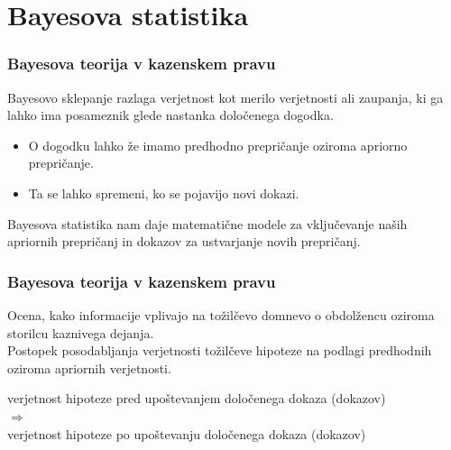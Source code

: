 \documentclass{beamer}
\begin{document}
\section{Bayesova statistika}

\begin{frame}
    \frametitle{Bayesova teorija v kazenskem pravu}
    Bayesovo sklepanje razlaga verjetnost kot merilo verjetnosti ali zaupanja, ki ga lahko ima posameznik glede nastanka določenega dogodka.
    \begin{itemize}
      \item O dogodku lahko že imamo predhodno prepričanje oziroma apriorno prepričanje.
      \item Ta se lahko spremeni, ko se pojavijo novi dokazi.
    \end{itemize} \vspace{3mm}
    Bayesova statistika nam daje matematične modele za vključevanje naših apriornih prepričanj in dokazov za ustvarjanje novih prepričanj.
\end{frame}

\begin{frame}
    \frametitle{Bayesova teorija v kazenskem pravu}
    Ocena, kako informacije vplivajo na tožilčevo domnevo o obdolžencu oziroma storilcu kaznivega dejanja. \\ \vspace{3mm}
    Postopek posodabljanja verjetnosti tožilčeve hipoteze na podlagi predhodnih oziroma apriornih verjetnosti. \\ \vspace{3mm}
    \begin{block}{}
        \centering
        verjetnost hipoteze pred upoštevanjem določenega dokaza (dokazov) \\ \vspace{2mm}
        $\Rightarrow$ \\ \vspace{3mm}
        verjetnost hipoteze po upoštevanju določenega dokaza (dokazov)
    \end{block}
\end{frame}
\end{document}
